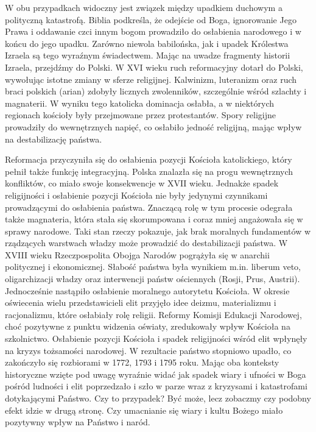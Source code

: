 W obu przypadkach widoczny jest związek między upadkiem duchowym a
polityczną katastrofą. Biblia podkreśla, że odejście od Boga, ignorowanie Jego Prawa i
oddawanie czci innym bogom prowadziło do osłabienia narodowego i w końcu do jego
upadku. Zarówno niewola babilońska, jak i upadek Królestwa Izraela są tego wyraźnym
świadectwem.
Mając na uwadze fragmenty historii Izraela, przejdźmy do Polski. W XVI wieku ruch
reformacyjny dotarł do Polski, wywołując istotne zmiany w sferze religijnej. Kalwinizm, 
luteranizm oraz ruch braci polskich (arian) zdobyły licznych zwolenników, szczególnie
wśród szlachty i magnaterii. W wyniku tego katolicka dominacja osłabła, a w niektórych
regionach kościoły były przejmowane przez protestantów. Spory religijne prowadziły do
wewnętrznych napięć, co osłabiło jedność religijną, mając wpływ na destabilizację
państwa.

Reformacja przyczyniła się do osłabienia pozycji Kościoła katolickiego, który pełnił
także funkcję integracyjną. Polska znalazła się na progu wewnętrznych konfliktów, co
miało swoje konsekwencje w XVII wieku. Jednakże spadek religijności i osłabienie pozycji
Kościoła nie były jedynymi czynnikami prowadzącymi do osłabienia państwa. Znaczącą
rolę w tym procesie odegrała także magnateria, która stała się skorumpowana i coraz
mniej angażowała się w sprawy narodowe. Taki stan rzeczy pokazuje, jak brak moralnych
fundamentów w rządzących warstwach władzy może prowadzić do destabilizacji państwa.
W XVIII wieku Rzeczpospolita Obojga Narodów pogrążyła się w anarchii politycznej i
ekonomicznej. Słabość państwa była wynikiem m.in. liberum veto, oligarchizacji władzy
oraz interwencji państw ościennych (Rosji, Prus, Austrii). Jednocześnie nastąpiło
osłabienie moralnego autorytetu Kościoła. W okresie oświecenia wielu przedstawicieli elit
przyjęło idee deizmu, materializmu i racjonalizmu, które osłabiały rolę religii. Reformy
Komisji Edukacji Narodowej, choć pozytywne z punktu widzenia oświaty, zredukowały
wpływ Kościoła na szkolnictwo. Osłabienie pozycji Kościoła i spadek religijności wśród elit
wpłynęły na kryzys tożsamości narodowej. W rezultacie państwo stopniowo upadło, co
zakończyło się rozbiorami w 1772, 1793 i 1795 roku.
Mając oba konteksty historyczne wzięte pod uwagę wyraźnie widać jak spadek wiary
i ufności w Boga pośród ludności i elit poprzedzało i szło w parze wraz z kryzysami i
katastrofami dotykającymi Państwo. Czy to przypadek? Być może, lecz zobaczmy czy
podobny efekt idzie w drugą stronę. Czy umacnianie się wiary i kultu Bożego miało
pozytywny wpływ na Państwo i naród. 

